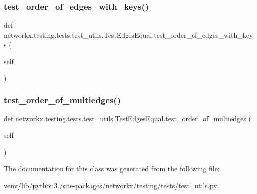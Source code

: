 \subsubsection{\texorpdfstring{test\+\_\+order\+\_\+of\+\_\+edges\+\_\+with\+\_\+keys()}{test\_order\_of\_edges\_with\_keys()}}
{\footnotesize\ttfamily def networkx.\+testing.\+tests.\+test\+\_\+utils.\+Test\+Edges\+Equal.\+test\+\_\+order\+\_\+of\+\_\+edges\+\_\+with\+\_\+keys (\begin{DoxyParamCaption}\item[{}]{self }\end{DoxyParamCaption})}

\mbox{\label{classnetworkx_1_1testing_1_1tests_1_1test__utils_1_1TestEdgesEqual_af3a81729e239f5227e25d37981b63059}} 
\subsubsection{\texorpdfstring{test\+\_\+order\+\_\+of\+\_\+multiedges()}{test\_order\_of\_multiedges()}}
{\footnotesize\ttfamily def networkx.\+testing.\+tests.\+test\+\_\+utils.\+Test\+Edges\+Equal.\+test\+\_\+order\+\_\+of\+\_\+multiedges (\begin{DoxyParamCaption}\item[{}]{self }\end{DoxyParamCaption})}



The documentation for this class was generated from the following file\+:\begin{DoxyCompactItemize}
\item 
venv/lib/python3./site-\/packages/networkx/testing/tests/\hyperlink{networkx_2testing_2tests_2test__utils_8py}{test\+\_\+utils.\+py}\end{DoxyCompactItemize}
